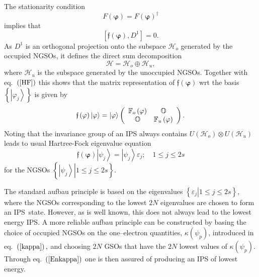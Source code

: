 \documentclass[aps,preprint]{revtex4}%
\begin{document}
The stationarity condition
\begin{equation}
F\left(  \mathbf{\varphi}\right)  =F\left(  \mathbf{\varphi}\right)
^{\dagger}%
\end{equation}
implies that
\begin{equation}
\left[  \mathfrak{f}\left(  \mathbf{\varphi}\right)  ,D^{1}\right]  =0.
\label{HF}%
\end{equation}
As $D^{1}$ is an orthogonal projection onto the subspace $\mathcal{H}_{o}$
generated by the occupied NGSOs, it defines the direct sum decomposition
\begin{equation}
\mathcal{H=H}_{o}\oplus\mathcal{H}_{u}, \label{DS}%
\end{equation}
where $\mathcal{H}_{u}$ is the subspace generated by the unoccupied NGSOs.
Together with eq.\ $\left(  \ref{HF}\right)  $ this shows that the matrix
representation of $\mathfrak{f}\left(  \mathbf{\varphi}\right)  $ wrt the
basis $\left\{  \left\vert \varphi_{j}\right\rangle \right\}  $ is given by
\begin{equation}
\mathfrak{f}\left(  \mathbf{\varphi}\right)  \left\vert \mathbf{\varphi
}\right\rangle =\left\vert \mathbf{\varphi}\right\rangle \left(
\begin{array}
[c]{cc}%
\mathbb{F}_{o}\left(  \mathbf{\varphi}\right)  & \mathbb{O}\\
\mathbb{O} & \mathbb{F}_{u}\left(  \mathbf{\varphi}\right)
\end{array}
\right)  .
\end{equation}
Noting that the invariance group of an IPS always contains $U\left(
\mathcal{H}_{o}\right)  \otimes U\left(  \mathcal{H}_{u}\right)  $ leads to
usual Hartree-Fock eigenvalue equation
\begin{equation}
\mathfrak{f}\left(  \mathbf{\varphi}\right)  \left\vert \psi_{j}\right\rangle
=\left\vert \psi_{j}\right\rangle \varepsilon_{j};\quad1\leq j\leq2s
\end{equation}
for the NGSOs $\left\{  \left.  \left\vert \psi_{j}\right\rangle \right\vert
1\leq j\leq2s\right\}  $.

The standard aufbau principle is based on the eigenvalues $\left\{  \left.
\varepsilon_{j}\right\vert 1\leq j\leq2s\right\}  ,$ where the NGSOs
corresponding to the lowest $2N$ eigenvalues are chosen to form an IPS\ state.
However, as is well known, this does not always lead to the lowest energy IPS.
A more reliable aufbau principle can be constructed by basing the choice of
occupied NGSOs on the one--electron quantities, $\kappa\left(  \psi
_{p}\right)  $, introduced in eq.\ $\left(  \ref{kappa}\right)  ,$ and
choosing $2N$ GSOs that have the $2N$ lowest values of $\kappa\left(  \psi
_{p}\right)  $. Through eq.\ $\left(  \ref{Enkappa}\right)  $ one is then
assured of producing an IPS of lowest energy.
\end{document}
